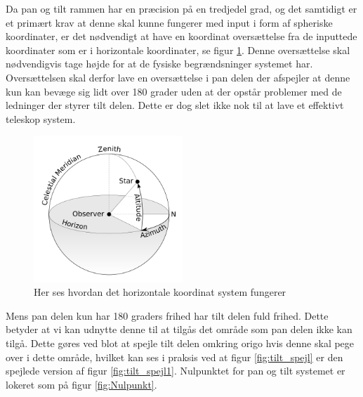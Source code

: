 Da pan og tilt rammen har en præcision på en tredjedel grad, og det samtidigt er et primært krav at denne skal kunne fungerer med input i form af spheriske koordinater, er det nødvendigt at have en koordinat oversættelse fra de inputtede koordinater som er i horizontale koordinater, se figur \ref{fig:Horizontal}. Denne oversættelse skal nødvendigvis tage højde for at de fysiske begrændsninger systemet har. Oversættelsen skal derfor lave en oversættelse i pan delen der afspejler at denne kun kan bevæge sig lidt over 180 grader uden at der opstår problemer med de ledninger der styrer tilt delen. Dette er dog slet ikke nok til at lave et effektivt teleskop system.
\begin{figure}[!h]
	\begin{center}
		\includegraphics[width=0.5\textwidth]{Billeder/Horizontal.png}
	\end{center}		
	\caption{Her ses hvordan det horizontale koordinat system fungerer}
	\label{fig:Horizontal}
\end{figure}

Mens pan delen kun har 180 graders frihed har tilt delen fuld frihed. Dette betyder at vi kan udnytte denne til at tilgås det område som pan delen ikke kan tilgå. Dette gøres ved blot at spejle tilt delen omkring origo hvis denne skal pege over i dette område, hvilket kan ses i praksis ved at figur \ref{fig:tilt_spejl} er den spejlede version af figur \ref{fig:tilt_spejl1}. Nulpunktet for pan og tilt systemet er lokeret som på figur \ref{fig:Nulpunkt}. 

